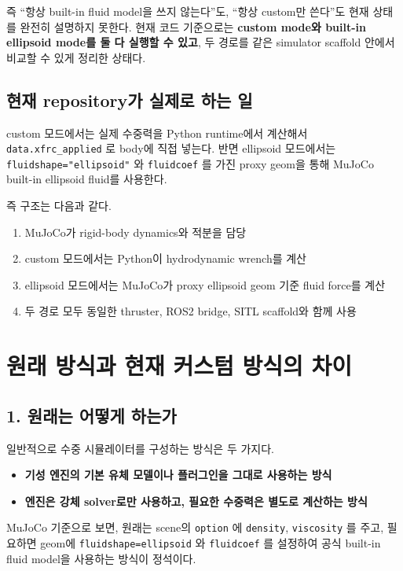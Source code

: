 \documentclass[11pt,a4paper]{article}
\newcommand{\code}[1]{\nolinkurl{#1}}
\begin{document}
즉 ``항상 built-in fluid model을 쓰지 않는다''도, ``항상 custom만 쓴다''도 현재 상태를 완전히 설명하지 못한다. 현재 코드 기준으로는 \textbf{custom mode와 built-in ellipsoid mode를 둘 다 실행할 수 있고}, 두 경로를 같은 simulator scaffold 안에서 비교할 수 있게 정리한 상태다.

\subsection{현재 repository가 실제로 하는 일}

custom 모드에서는 실제 수중력을 Python runtime에서 계산해서 \texttt{data.xfrc\_applied} 로 body에 직접 넣는다. 반면 ellipsoid 모드에서는 \texttt{fluidshape="ellipsoid"} 와 \texttt{fluidcoef} 를 가진 proxy geom을 통해 MuJoCo built-in ellipsoid fluid를 사용한다.

즉 구조는 다음과 같다.

\begin{enumerate}[leftmargin=2em]
  \item MuJoCo가 rigid-body dynamics와 적분을 담당
  \item custom 모드에서는 Python이 hydrodynamic wrench를 계산
  \item ellipsoid 모드에서는 MuJoCo가 proxy ellipsoid geom 기준 fluid force를 계산
  \item 두 경로 모두 동일한 thruster, ROS2 bridge, SITL scaffold와 함께 사용
\end{enumerate}

\section{원래 방식과 현재 커스텀 방식의 차이}

\subsection{1. 원래는 어떻게 하는가}

일반적으로 수중 시뮬레이터를 구성하는 방식은 두 가지다.

\begin{itemize}[leftmargin=2em]
  \item \textbf{기성 엔진의 기본 유체 모델이나 플러그인을 그대로 사용하는 방식}
  \item \textbf{엔진은 강체 solver로만 사용하고, 필요한 수중력은 별도로 계산하는 방식}
\end{itemize}

MuJoCo 기준으로 보면, 원래는 scene의 \texttt{option} 에 \texttt{density}, \texttt{viscosity} 를 주고, 필요하면 geom에 \code{fluidshape=ellipsoid} 와 \code{fluidcoef} 를 설정하여 공식 built-in fluid model을 사용하는 방식이 정석이다.
\end{document}
